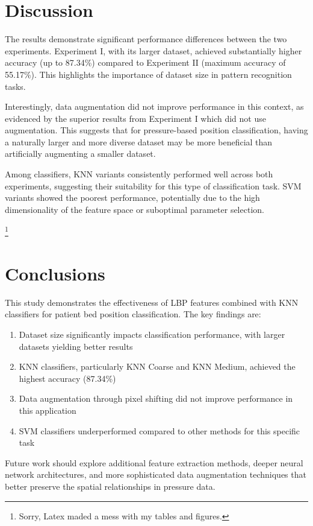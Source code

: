 \documentclass[10pt]{article}
\begin{document}
    \newpage

  \section{Discussion}
  
  The results demonstrate significant performance differences between the two experiments. Experiment I, with its larger dataset, 
  achieved substantially higher accuracy (up to 87.34\%) compared to Experiment II (maximum accuracy of 55.17\%). This highlights 
  the importance of dataset size in pattern recognition tasks.
  
  Interestingly, data augmentation did not improve performance in this context, as evidenced by the superior results from 
  Experiment I which did not use augmentation. This suggests that for pressure-based position classification, having a naturally 
  larger and more diverse dataset may be more beneficial than artificially augmenting a smaller dataset.
  
  Among classifiers, KNN variants consistently performed well across both experiments, suggesting their suitability for this 
  type of classification task. SVM variants showed the poorest performance, potentially due to the high dimensionality of 
  the feature space or suboptimal parameter selection.

  \footnote{Sorry, Latex maded a mess with my tables and figures.}

  \section{Conclusions}
  
  This study demonstrates the effectiveness of LBP features combined with KNN classifiers for patient bed position classification. 
  The key findings are:
  
  \begin{enumerate}
    \item Dataset size significantly impacts classification performance, with larger datasets yielding better results
    \item KNN classifiers, particularly KNN Coarse and KNN Medium, achieved the highest accuracy (87.34\%)
    \item Data augmentation through pixel shifting did not improve performance in this application
    \item SVM classifiers underperformed compared to other methods for this specific task
  \end{enumerate}
  
  Future work should explore additional feature extraction methods, deeper neural network architectures, and more sophisticated 
  data augmentation techniques that better preserve the spatial relationships in pressure data.

  \newpage

  \printbibliography
\end{document}
